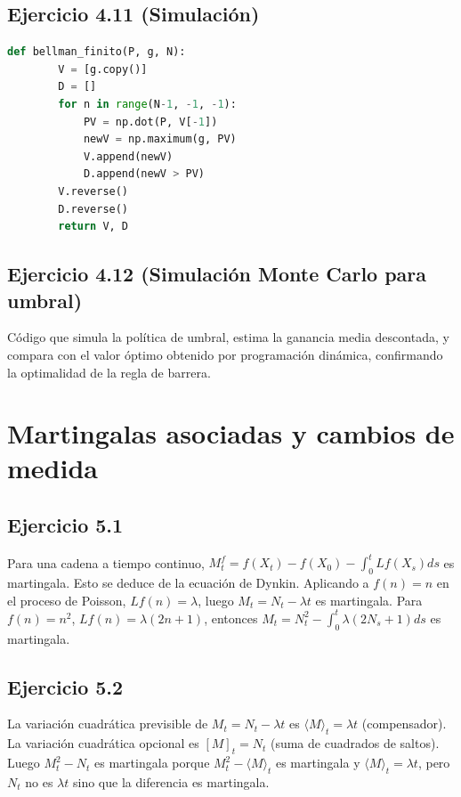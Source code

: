 \documentclass[letterpaper, 12pt]{article}
\newcommand{\1}{\mathbbm{1}}
\begin{document}
    \subsection{Ejercicio 4.11 (Simulaci\'on)}
    \begin{lstlisting}[language=Python, caption=Iteraci\'on de Bellman]
    def bellman_finito(P, g, N):
        V = [g.copy()]
        D = []
        for n in range(N-1, -1, -1):
            PV = np.dot(P, V[-1])
            newV = np.maximum(g, PV)
            V.append(newV)
            D.append(newV > PV)
        V.reverse()
        D.reverse()
        return V, D
    \end{lstlisting}

    \subsection{Ejercicio 4.12 (Simulaci\'on Monte Carlo para umbral)}
    C\'odigo que simula la pol\'itica de umbral, estima la ganancia media descontada, y compara con el valor \'optimo obtenido por programaci\'on din\'amica, confirmando la optimalidad de la regla de barrera.

    \section{Martingalas asociadas y cambios de medida}

    \subsection{Ejercicio 5.1}
    Para una cadena a tiempo continuo, $M_t^f=f(X_t)-f(X_0)-\int_0^t Lf(X_s)ds$ es martingala. Esto se deduce de la ecuaci\'on de Dynkin. Aplicando a $f(n)=n$ en el proceso de Poisson, $Lf(n)=\lambda$, luego $M_t=N_t-\lambda t$ es martingala. Para $f(n)=n^2$, $Lf(n)=\lambda(2n+1)$, entonces $M_t=N_t^2-\int_0^t\lambda(2N_s+1)ds$ es martingala.

    \subsection{Ejercicio 5.2}
    La variaci\'on cuadr\'atica previsible de $M_t=N_t-\lambda t$ es $\langle M\rangle_t=\lambda t$ (compensador). La variaci\'on cuadr\'atica opcional es $[M]_t=N_t$ (suma de cuadrados de saltos). Luego $M_t^2-N_t$ es martingala porque $M_t^2-\langle M\rangle_t$ es martingala y $\langle M\rangle_t=\lambda t$, pero $N_t$ no es $\lambda t$ sino que la diferencia es martingala.
\end{document}
